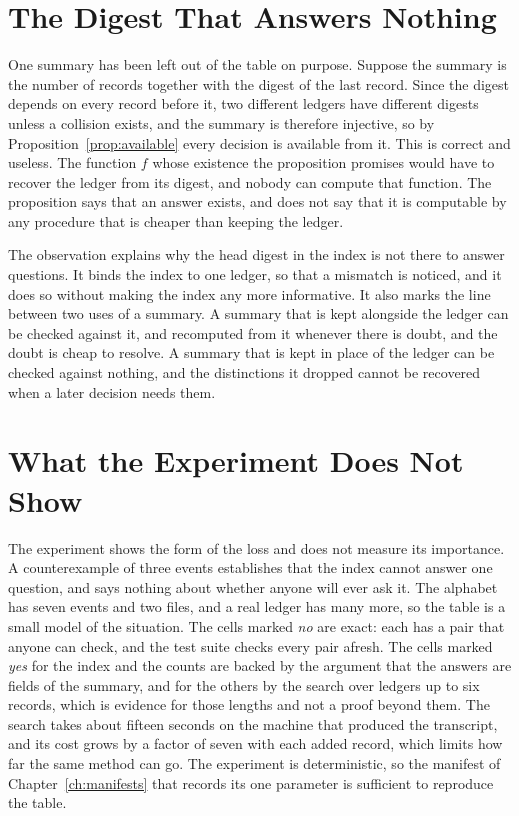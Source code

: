 \section{The Digest That Answers Nothing}

One summary has been left out of the table on purpose. Suppose the summary is the number of records together with the digest of the last record. Since the digest depends on every record before it, two different ledgers have different digests unless a collision exists, and the summary is therefore injective, so by Proposition~\ref{prop:available} every decision is available from it. This is correct and useless. The function $f$ whose existence the proposition promises would have to recover the ledger from its digest, and nobody can compute that function. The proposition says that an answer exists, and does not say that it is computable by any procedure that is cheaper than keeping the ledger.

The observation explains why the head digest in the index is not there to answer questions. It binds the index to one ledger, so that a mismatch is noticed, and it does so without making the index any more informative. It also marks the line between two uses of a summary. A summary that is kept alongside the ledger can be checked against it, and recomputed from it whenever there is doubt, and the doubt is cheap to resolve. A summary that is kept in place of the ledger can be checked against nothing, and the distinctions it dropped cannot be recovered when a later decision needs them.

\section{What the Experiment Does Not Show}

The experiment shows the form of the loss and does not measure its importance. A counterexample of three events establishes that the index cannot answer one question, and says nothing about whether anyone will ever ask it. The alphabet has seven events and two files, and a real ledger has many more, so the table is a small model of the situation. The cells marked \emph{no} are exact: each has a pair that anyone can check, and the test suite checks every pair afresh. The cells marked \emph{yes} for the index and the counts are backed by the argument that the answers are fields of the summary, and for the others by the search over ledgers up to six records, which is evidence for those lengths and not a proof beyond them. The search takes about fifteen seconds on the machine that produced the transcript, and its cost grows by a factor of seven with each added record, which limits how far the same method can go. The experiment is deterministic, so the manifest of Chapter~\ref{ch:manifests} that records its one parameter is sufficient to reproduce the table.

